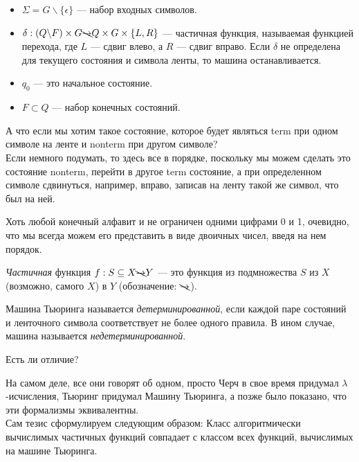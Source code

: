 \begin{Def}
\begin{itemize}
        \item $\Sigma = G \backslash \{\epsilon\}$ --- набор входных символов.
        \item $\delta : (Q \backslash F) \times G \bcancel{\rightarrow}
        Q \times G \times \{L, R\}$ --- частичная функция, называемая функцией перехода, где $L$ --- сдвиг влево, а $R$ --- сдвиг вправо. Если $\delta$ не определена для текущего состояния и символа ленты, то машина останавливается.
        \item $q_0$ --- это начальное состояние.
        \item $F \subset {Q}$  --- набор конечных состояний.
        \end{itemize}
    \end{Def} 
    \begin{Rem}
        А что если мы хотим такое состояние, которое будет являться term при одном символе на ленте и nonterm при другом символе?\\
        Если немного подумать, то здесь все в порядке, поскольку мы можем сделать это состояние nonterm, перейти в другое term состояние, а при определенном символе сдвинуться, например, вправо, записав на ленту такой же символ, что был на ней.
    \end{Rem}
    \begin{Rem}
        Хоть любой конечный алфавит и не ограничен одними цифрами 0 и 1, очевидно, что мы всегда можем его представить в виде двоичных чисел, введя на нем порядок.
    \end{Rem}
    \begin{Def}
        \textit{Частичная} функция $f : S \subseteq X \bcancel{\rightarrow} Y$ --- это функция из подмножества $S$ из $X$ (возможно, самого $X$) в $Y$ (обозначение: $\bcancel{\rightarrow}$). 
    \end{Def}
    \begin{Def}
        Машина Тьюринга называется \textit{детерминированной}, если каждой паре состояний и ленточного символа соответствует не более одного правила. 
        В ином случае, машина называется \textit{недетерминированной}.
    \end{Def}
    \begin{Def}
        Есть ли отличие?

        На самом деле, все они говорят об одном, просто Черч в свое время придумал $\lambda$-исчисления, Тьюринг придумал Машину Тьюринга, а позже было показано, что эти формализмы эквивалентны.\\
        Сам тезис сформулируем следующим образом: Класс алгоритмически вычислимых частичных функций совпадает с классом всех функций, вычислимых на машине Тьюринга.
    \end{Def}
